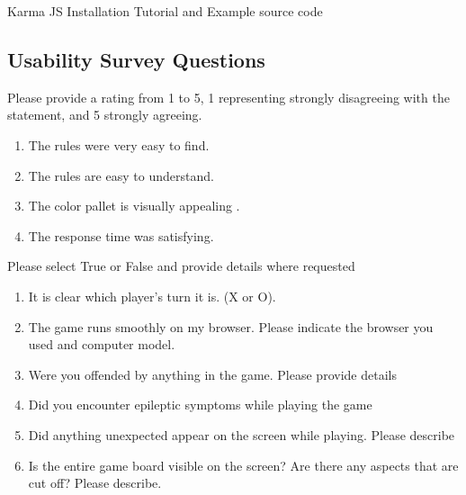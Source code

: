 \documentclass[12pt, titlepage]{article}
\begin{document}
Karma JS Installation Tutorial and Example source code~\citep{Karma}

\subsection{Usability Survey Questions}

Please provide a rating from 1 to 5, 1 representing strongly disagreeing with the statement, and 5 strongly agreeing.
\begin{enumerate}
\item
The rules were very easy to find. \label{question:q1}
\item
The rules are easy to understand. \label{question:q2}
\item
The color pallet is visually appealing .\label{question:q4}
\item
The response time was satisfying. \label{question:q5}
\end{enumerate}
Please select True or False and provide details where requested
\begin{enumerate}
\item
It is clear which player's turn it is. (X or O). \label{question:q3}
\item
The game runs smoothly on my browser. Please indicate the browser you used and computer model. \label{question:q6}
\item
Were you offended by anything in the game. Please provide details \label{question:q8}
\item
Did you encounter epileptic symptoms while playing the game \label{question:q9}
\item
Did anything unexpected appear on the screen while playing. Please describe
\label{question:q10}
\item
Is the entire game board visible on the screen? Are there any aspects that are
cut off? Please describe. \label{question:q11}
\end{enumerate}

\newpage
\end{document}

